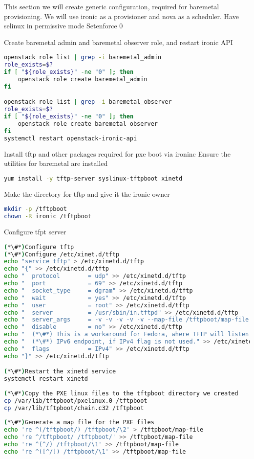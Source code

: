 This section we will create generic configuration, required for baremetal provisioning. We will use ironic as a provisioner and nova as a scheduler.
Have selinux in permissive mode
Setenforce 0

Create baremetal admin and baremetal observer role, and restart ironic API

\begin{lstlisting}[language=bash,keywords={}]
openstack role list | grep -i baremetal_admin
role_exists=$?
if [ "${role_exists}" -ne "0" ]; then 
    openstack role create baremetal_admin
fi

openstack role list | grep -i baremetal_observer 
role_exists=$?
if [ "${role_exists}" -ne "0" ]; then
    openstack role create baremetal_observer
fi
systemctl restart openstack-ironic-api
\end{lstlisting}

Install tftp and other packages required for pxe boot via ironinc
Ensure the utilities for baremetal are installed

\begin{lstlisting}[language=bash,keywords={}]
yum install -y tftp-server syslinux-tftpboot xinetd
\end{lstlisting}

Make the directory for tftp and give it the ironic owner

\begin{lstlisting}[language=bash,keywords={}]
mkdir -p /tftpboot
chown -R ironic /tftpboot
\end{lstlisting}

Configure tfpt server

\begin{lstlisting}[language=bash,keywords={}]
(*\#*)Configure tftp 
(*\#*)Configure /etc/xinet.d/tftp
echo "service tftp" > /etc/xinetd.d/tftp
echo "{" >> /etc/xinetd.d/tftp
echo "  protocol        = udp" >> /etc/xinetd.d/tftp
echo "  port            = 69" >> /etc/xinetd.d/tftp
echo "  socket_type     = dgram" >> /etc/xinetd.d/tftp
echo "  wait            = yes" >> /etc/xinetd.d/tftp
echo "  user            = root" >> /etc/xinetd.d/tftp
echo "  server          = /usr/sbin/in.tftpd" >> /etc/xinetd.d/tftp
echo "  server_args     = -v -v -v -v -v --map-file /tftpboot/map-file /tftpboot" >> /etc/xinetd.d/tftp
echo "  disable         = no" >> /etc/xinetd.d/tftp
echo "  (*\#*) This is a workaround for Fedora, where TFTP will listen only on" >> /etc/xinetd.d/tftp
echo "  (*\#*) IPv6 endpoint, if IPv4 flag is not used." >> /etc/xinetd.d/tftp
echo "  flags           = IPv4" >> /etc/xinetd.d/tftp
echo "}" >> /etc/xinetd.d/tftp

(*\#*)Restart the xinetd service
systemctl restart xinetd
    
(*\#*)Copy the PXE linux files to the tftpboot directory we created
cp /var/lib/tftpboot/pxelinux.0 /tftpboot
cp /var/lib/tftpboot/chain.c32 /tftpboot
    
(*\#*)Generate a map file for the PXE files
echo 're ^(/tftpboot/) /tftpboot/\2' > /tftpboot/map-file
echo 're ^/tftpboot/ /tftpboot/' >> /tftpboot/map-file
echo 're ^(^/) /tftpboot/\1' >> /tftpboot/map-file
echo 're ^([^/]) /tftpboot/\1' >> /tftpboot/map-file
\end{lstlisting}


